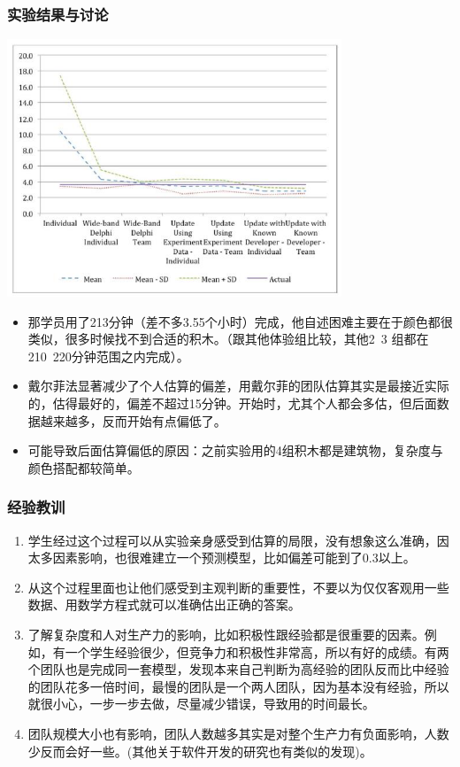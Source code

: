 \hypertarget{ux5b9eux9a8cux7ed3ux679cux4e0eux8ba8ux8bba}{%
\subsubsection{实验结果与讨论}\label{ux5b9eux9a8cux7ed3ux679cux4e0eux8ba8ux8bba}}


\includegraphics[width=10cm]{Lego3.jpg}

\begin{itemize}
\tightlist
\item
  那学员用了213分钟（差不多3.55个小时）完成，他自述困难主要在于颜色都很类似，很多时候找不到合适的积木。（跟其他体验组比较，其他2~3 组都在210~220分钟范围之内完成）。
\item
  戴尔菲法显著减少了个人估算的偏差，用戴尔菲的团队估算其实是最接近实际的，估得最好的，偏差不超过15分钟。开始时，尤其个人都会多估，但后面数据越来越多，反而开始有点偏低了。
\item
  可能导致后面估算偏低的原因：之前实验用的4组积木都是建筑物，复杂度与颜色搭配都较简单。
\end{itemize}

\hypertarget{ux7ecfux9a8cux6559ux8bad}{%
\subsubsection{经验教训}\label{ux7ecfux9a8cux6559ux8bad}}

\begin{enumerate}
\tightlist
\item
  学生经过这个过程可以从实验亲身感受到估算的局限，没有想象这么准确，因太多因素影响，也很难建立一个预测模型，比如偏差可能到了0.3以上。
\item
  从这个过程里面也让他们感受到主观判断的重要性，不要以为仅仅客观用一些数据、用数学方程式就可以准确估出正确的答案。
\item
  了解复杂度和人对生产力的影响，比如积极性跟经验都是很重要的因素。例如，有一个学生经验很少，但竞争力和积极性非常高，所以有好的成绩。有两个团队也是完成同一套模型，发现本来自己判断为高经验的团队反而比中经验的团队花多一倍时间，最慢的团队是一个两人团队，因为基本没有经验，所以就很小心，一步一步去做，尽量减少错误，导致用的时间最长。
\item
  团队规模大小也有影响，团队人数越多其实是对整个生产力有负面影响，人数少反而会好一些。(其他关于软件开发的研究也有类似的发现)。
\end{enumerate}

